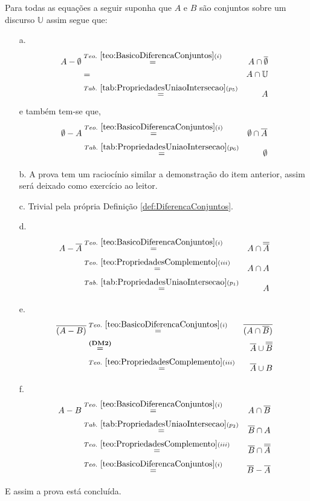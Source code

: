 \begin{prova}
  Para todas as equações a seguir suponha que $A$ e $B$ são conjuntos sobre um discurso $\mathbb{U}$ assim segue que:
  \begin{itemize}
    \item[a.]
    \begin{eqnarray*}
      A - \emptyset & \stackrel{Teo. \  \ref{teo:BasicoDiferencaConjuntos}(i)}{=}& A \cap \overline{\emptyset} \\
      & = & A \cap \mathbb{U} \\
      & \stackrel{Tab. \ \ref{tab:PropriedadesUniaoIntersecao}(p_5)}{=} & A
    \end{eqnarray*}
    e também tem-se que,
    \begin{eqnarray*}
      \emptyset - A &\stackrel{Teo. \  \ref{teo:BasicoDiferencaConjuntos}(i)}{=}& \emptyset \cap \overline{A}\\
      &\stackrel{Tab. \ \ref{tab:PropriedadesUniaoIntersecao}(p_6)}{=}& \emptyset
    \end{eqnarray*}
    \item[b.] A prova tem um raciocínio similar a demonstração do item anterior, assim será deixado como exercício ao leitor.
    \item[c.] Trivial pela própria Definição \ref{def:DiferencaConjuntos}.
    \item[d.]
    \begin{eqnarray*}
      A - \overline{A} &\stackrel{Teo. \  \ref{teo:BasicoDiferencaConjuntos}(i)}{=}& A \cap \overline{\overline{A}}\\
      &\stackrel{Teo. \ \ref{teo:PropriedadesComplemento}(iii)}{=}& A \cap A\\
      &\stackrel{Tab. \ \ref{tab:PropriedadesUniaoIntersecao}(p_1)}{=}& A
    \end{eqnarray*}
    \item[e.]
    \begin{eqnarray*}
      \overline{(A - B)} &\stackrel{Teo. \  \ref{teo:BasicoDiferencaConjuntos}(i)}{=}& \overline{(A \cap \overline{B})}\\
      &\stackrel{\textbf{(DM2)}}{=}& \overline{A} \cup \overline{\overline{B}}\\
      &\stackrel{Teo. \ \ref{teo:PropriedadesComplemento}(iii)}{=}&  \overline{A} \cup  B
    \end{eqnarray*}
    \item[f.]
    \begin{eqnarray*}
      A - B &\stackrel{Teo. \  \ref{teo:BasicoDiferencaConjuntos}(i)}{=}& A \cap \overline{B}\\
      &\stackrel{Tab. \ \ref{tab:PropriedadesUniaoIntersecao}(p_2)}{=}& \overline{B} \cap A\\
      &\stackrel{Teo. \ \ref{teo:PropriedadesComplemento}(iii)}{=}& \overline{B} \cap \overline{\overline{A}}\\
      &\stackrel{Teo. \  \ref{teo:BasicoDiferencaConjuntos}(i)}{=}&  \overline{B} - \overline{A}
    \end{eqnarray*}
  \end{itemize}
  E assim a prova está concluída.
\end{prova}

